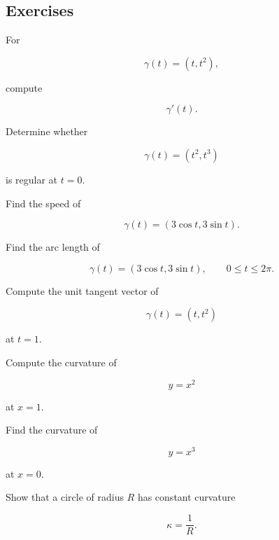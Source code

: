 \subsection{Exercises}
\label{subsec:differential-geometry-exercises}

\begin{exercise}[1]
For

\[
\gamma(t)=(t,t^2),
\]

compute

\[
\gamma'(t).
\]
\end{exercise}

\begin{exercise}[1]
Determine whether

\[
\gamma(t)=(t^2,t^3)
\]

is regular at \(t=0\).
\end{exercise}

\begin{exercise}[1]
Find the speed of

\[
\gamma(t)=(3\cos t,3\sin t).
\]
\end{exercise}

\begin{exercise}[1]
Find the arc length of

\[
\gamma(t)=(3\cos t,3\sin t),
\qquad
0\leq t\leq2\pi.
\]
\end{exercise}

\begin{exercise}[2]
Compute the unit tangent vector of

\[
\gamma(t)=(t,t^2)
\]

at \(t=1\).
\end{exercise}

\begin{exercise}[2]
Compute the curvature of

\[
y=x^2
\]

at \(x=1\).
\end{exercise}

\begin{exercise}[2]
Find the curvature of

\[
y=x^3
\]

at \(x=0\).
\end{exercise}

\begin{exercise}[2]
Show that a circle of radius \(R\) has constant curvature

\[
\kappa=\frac1R.
\]
\end{exercise}

